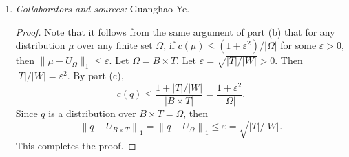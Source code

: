 \documentclass[letterpaper, reqno,11pt]{article}
\newcommand{\PP}{\mathop{{}\mathbb{P}}}
\begin{document}
\begin{enumerate}
\begin{enumerate}
\begin{proof}
\begin{align*}
        &= \frac{1}{|B|} \PP_{\substack{h \in B \\ x_1, x_2 \in_U W}} \left[h\left(x_1\right) = h\left(x_2\right) \;\middle|\; h\right] \\
        &\leq \frac{1}{|B|} \left(\frac{1}{|W|} + \frac{1}{|T|}\right) \\
        &= \frac{1}{|B|} \cdot \frac{|T|/|W| + 1}{|T|} \\
        &= \frac{1 + |T|/|W|}{|B| \cdot |T|} \\
        &= \frac{1 + |T|/|W|}{|B \times T|}.
      \end{align*}
      This completes the proof.
    \end{proof}

    \clearpage

    \item \noindent\emph{Collaborators and sources:} Guanghao Ye.
    
    \begin{proof}
      Note that it follows from the same argument of part (b) that for any distribution $\mu$ over any finite set $\Omega$, if $c(\mu) \leq (1 + \varepsilon^2)/|\Omega|$ for some $\varepsilon > 0$, then $\|\mu - U_\Omega\|_1 \leq \varepsilon$. Let $\Omega = B \times T$. Let $\varepsilon = \sqrt{|T|/|W|} > 0$. Then $|T|/|W| = \varepsilon^2$. By part (c),
      $$ c(q) \leq \frac{1 + |T|/|W|}{|B \times T|} = \frac{1 + \varepsilon^2}{|\Omega|}. $$
      Since $q$ is a distribution over $B \times T = \Omega$, then
      $$ \left\| q - U_{B \times T}\right\|_1 = \left\| q - U_\Omega \right\|_1 \leq \varepsilon = \sqrt{|T|/|W|}. $$
      This completes the proof.
    \end{proof}
  \end{enumerate}
\end{enumerate}
\end{document}
